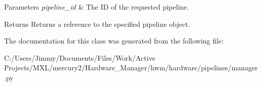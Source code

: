 \begin{DoxyParams}{Parameters}
{\em pipeline\-\_\-id} & The I\-D of the requested pipeline. \\
\hline
\end{DoxyParams}
\begin{DoxyReturn}{Returns}
Returns a reference to the specified pipeline object. 
\end{DoxyReturn}


The documentation for this class was generated from the following file\-:\begin{DoxyCompactItemize}
\item 
C\-:/\-Users/\-Jimmy/\-Documents/\-Files/\-Work/\-Active Projects/\-M\-X\-L/mercury2/\-Hardware\-\_\-\-Manager/hwm/hardware/pipelines/manager.\-py\end{DoxyCompactItemize}
